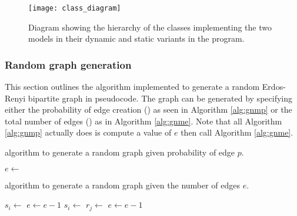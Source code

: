 \begin{figure}
  \centering
  \texttt{[image: class\_diagram]}
  \caption{Diagram showing the hierarchy of the classes implementing the two models in their dynamic and static variants in the \CC{} program.}
  \label{fig:class-diagram}
\end{figure}

\subsubsection{Random graph generation}

This section outlines the algorithm implemented to generate a random Erdos-Renyi bipartite graph \cite{Erdos1960} in pseudocode.
The graph can be generated by specifying either the probability of edge creation () as seen in Algorithm \ref{alg:gnmp} or the total number of edges () as in Algorithm \ref{alg:gnme}.
Note that all Algorithm \ref{alg:gnmp} actually does is compute a value of $e$ then call Algorithm \ref{alg:gnme}.

\begin{algorithm}
  \caption{ algorithm to generate a random \nbym{} graph given probability of edge $p$.} \label{alg:gnmp}
\begin{algorithmic}[1]
    \State $e \gets$ 
    \State \Return {}
  \EndProcedure
\end{algorithmic}
\end{algorithm}

\begin{algorithm}
  \caption{ algorithm to generate a random \nbym{} graph given the number of edges $e$.} \label{alg:gnme}
  \begin{algorithmic}[1]
          \State $s_i \gets$ 
          \State {}
          \State $e \gets e - 1$
        \EndFor
      \EndIf
        \State $s_i \gets$ 
        \State $r_j \gets$ 
        \State {}
        \State $e \gets e - 1$
      \EndWhile
    \EndProcedure  
  \end{algorithmic}
\end{algorithm}

